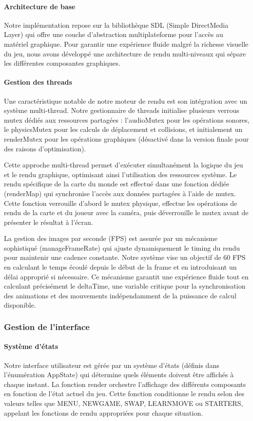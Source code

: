 \documentclass[12pt,a4paper, twoside]{article}
\begin{document}
\paragraph{Architecture de base} Notre implémentation repose sur la bibliothèque SDL (Simple DirectMedia Layer) qui offre une couche d'abstraction multiplateforme pour l'accès au matériel graphique. Pour garantir une expérience fluide malgré la richesse visuelle du jeu, nous avons développé une architecture de rendu multi-niveaux qui sépare les différentes composantes graphiques.

\paragraph{Gestion des threads} Une caractéristique notable de notre moteur de rendu est son intégration avec un système multi-thread. Notre gestionnaire de threads initialise plusieurs verrous mutex dédiés aux ressources partagées : l'audioMutex pour les opérations sonores, le physicsMutex pour les calculs de déplacement et collisions, et initialement un renderMutex pour les opérations graphiques (désactivé dans la version finale pour des raisons d'optimisation).

Cette approche multi-thread permet d'exécuter simultanément la logique du jeu et le rendu graphique, optimisant ainsi l'utilisation des ressources système. Le rendu spécifique de la carte du monde est effectué dans une fonction dédiée (renderMap) qui synchronise l'accès aux données partagées à l'aide de mutex. Cette fonction verrouille d'abord le mutex physique, effectue les opérations de rendu de la carte et du joueur avec la caméra, puis déverrouille le mutex avant de présenter le résultat à l'écran.

La gestion des images par seconde (FPS) est assurée par un mécanisme sophistiqué (manageFrameRate) qui ajuste dynamiquement le timing du rendu pour maintenir une cadence constante. Notre système vise un objectif de 60 FPS en calculant le temps écoulé depuis le début de la frame et en introduisant un délai approprié si nécessaire. Ce mécanisme garantit une expérience fluide tout en calculant précisément le deltaTime, une variable critique pour la synchronisation des animations et des mouvements indépendamment de la puissance de calcul disponible.

\subsubsection{Gestion de l'interface}
\paragraph{Système d'états} Notre interface utilisateur est gérée par un système d'états (définis dans l'énumération AppState) qui détermine quels éléments doivent être affichés à chaque instant. La fonction render orchestre l'affichage des différents composants en fonction de l'état actuel du jeu. Cette fonction conditionne le rendu selon des valeurs telles que MENU, NEWGAME, SWAP, LEARNMOVE ou STARTERS, appelant les fonctions de rendu appropriées pour chaque situation.
\end{document}
